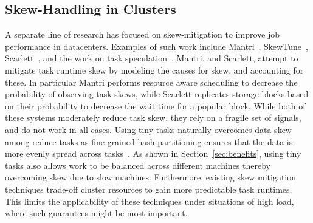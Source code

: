 \subsection{Skew-Handling in Clusters}
A separate line of research has focused on skew-mitigation to improve job
performance in datacenters. Examples of such work include
Mantri~\cite{ananthanarayanan2010reining}, SkewTune~\cite{kwon2012skewtune},
Scarlett~\cite{ananthanarayanan2011scarlett}, and the work on task
speculation~\cite{zaharia2008improving}. Mantri, and Scarlett, attempt to
mitigate task runtime skew by modeling the causes for skew, and accounting for
these. In particular Mantri performs resource aware scheduling to decrease the
probability of observing task skews, while Scarlett replicates storage blocks
based on their probability to decrease the wait time for a popular block. While
both of these systems moderately reduce task skew, they rely on a fragile set of
signals, and do not work in all cases. Using tiny tasks naturally overcomes data
skew among reduce tasks as fine-grained hash partitioning ensures that the data is
more evenly spread across tasks~\cite{something}. As shown in 
Section~\ref{sec:benefits}, using tiny tasks also allows work to be balanced across
different machines thereby overcoming skew due to slow machines.
Furthermore, existing skew mitigation techniques trade-off cluster resources to
gain more predictable task runtimes. This limits the applicability of these
techniques under situations of high load, where such guarantees might be most
important.

